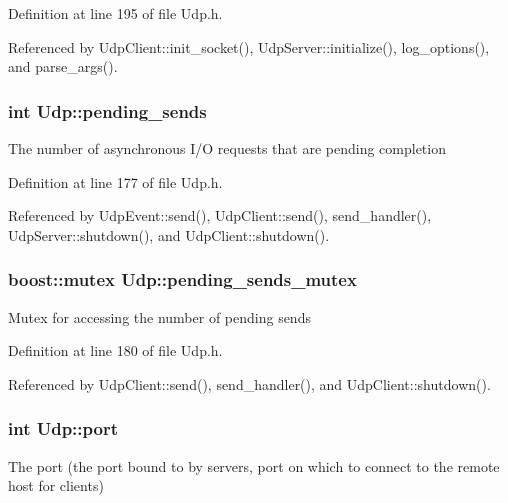 Definition at line 195 of file Udp.h.



Referenced by UdpClient::init\_\-socket(), UdpServer::initialize(), log\_\-options(), and parse\_\-args().

\hypertarget{classUdp_ac4b9b234de6090250125a1ea05764014}{
\subsubsection[{pending\_\-sends}]{\setlength{\rightskip}{0pt plus 5cm}int {\bf Udp::pending\_\-sends}}}
\label{classUdp_ac4b9b234de6090250125a1ea05764014}
The number of asynchronous I/O requests that are pending completion 

Definition at line 177 of file Udp.h.



Referenced by UdpEvent::send(), UdpClient::send(), send\_\-handler(), UdpServer::shutdown(), and UdpClient::shutdown().

\hypertarget{classUdp_af67ced15878e36d5dbfa433262876922}{
\subsubsection[{pending\_\-sends\_\-mutex}]{\setlength{\rightskip}{0pt plus 5cm}boost::mutex {\bf Udp::pending\_\-sends\_\-mutex}}}
\label{classUdp_af67ced15878e36d5dbfa433262876922}
Mutex for accessing the number of pending sends 

Definition at line 180 of file Udp.h.



Referenced by UdpClient::send(), send\_\-handler(), and UdpClient::shutdown().

\hypertarget{classUdp_af69ea781b31a1fa62e5d3012b6288dc8}{
\subsubsection[{port}]{\setlength{\rightskip}{0pt plus 5cm}int {\bf Udp::port}}}
\label{classUdp_af69ea781b31a1fa62e5d3012b6288dc8}
The port (the port bound to by servers, port on which to connect to the remote host for clients) 


